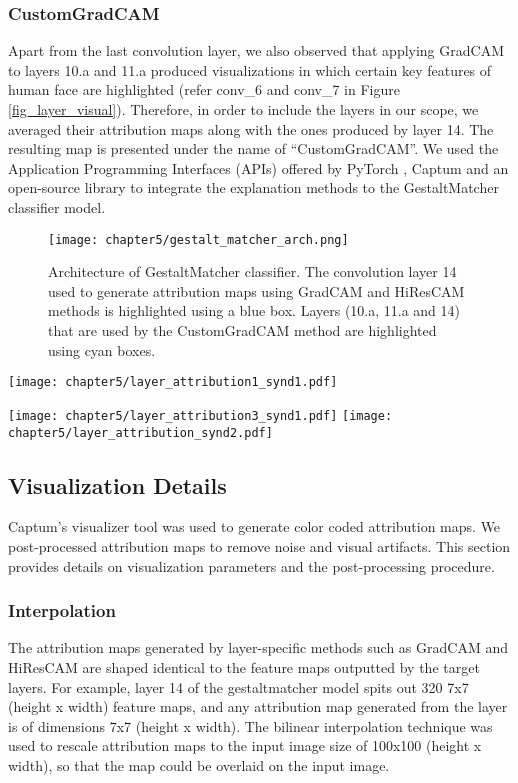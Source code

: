 \documentclass[../report.tex]{subfiles}
\begin{document}
	\subsubsection{CustomGradCAM}
	Apart from the last convolution layer, we also observed that applying GradCAM to layers 10.a and 11.a produced visualizations in which certain key features of human face are highlighted (refer conv\_6 and conv\_7 in Figure \ref{fig_layer_visual}). Therefore, in order to include the layers in our scope, we averaged their attribution maps along with the ones produced by layer 14. The resulting map is presented under the name of \enquote{CustomGradCAM}. We used the Application Programming Interfaces (APIs) offered by PyTorch \cite{paszke2019pytorch}, Captum \cite{kokhlikyan2020captum} and an open-source library \cite{jacobgilpytorchcam} to integrate the explanation methods to the GestaltMatcher classifier model.
	\begin{figure}[H]
		\hspace*{1.0cm}      
		\texttt{[image: chapter5/gestalt\_matcher\_arch.png]}
		\caption{Architecture of GestaltMatcher classifier. The convolution layer 14 used to generate attribution maps using GradCAM and HiResCAM methods is highlighted using a blue box. Layers (10.a, 11.a and 14) that are used by the CustomGradCAM method are highlighted using cyan boxes. }
		\label{fig_arch_gest_matcher}
	\end{figure}
	\begin{sidewaysfigure}
	\texttt{[image: chapter5/layer\_attribution1\_synd1.pdf]}
	
	\texttt{[image: chapter5/layer\_attribution3\_synd1.pdf]}
	\label{fig_gm_pipeline}	      
	\texttt{[image: chapter5/layer\_attribution\_synd2.pdf]}
	\caption{Layer-wise visualization of attribution maps generated by GradCAM and HiResCAM methods.}
	\label{fig_layer_visual}
\end{sidewaysfigure}
	\subsection{Visualization Details}
	 Captum's visualizer tool was used to generate color coded attribution maps. We post-processed attribution maps to remove noise and visual artifacts. This section provides details on visualization parameters and the post-processing procedure.
	\subsubsection{Interpolation}
	The attribution maps generated by layer-specific methods such as GradCAM and HiResCAM are shaped identical to the feature maps outputted by the target layers. For example, layer 14 of the gestaltmatcher model spits out 320 7x7 (height x width) feature maps, and any attribution map generated from the layer is of dimensions 7x7 (height x width). The bilinear interpolation technique \cite{bovik2009essential} was used to rescale attribution maps to the input image size of 100x100 (height x width), so that the map could be overlaid on the input image.
\end{document}
